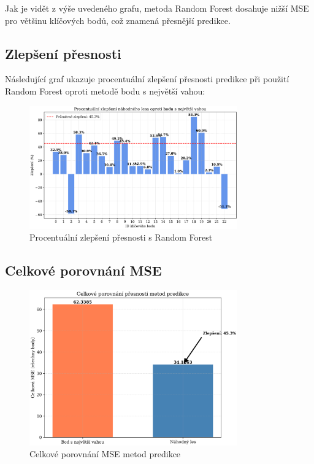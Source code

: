\documentclass[a4paper,12pt]{article}
\begin{document}
Jak je vidět z výše uvedeného grafu, metoda Random Forest dosahuje nižší MSE pro většinu klíčových bodů, což znamená přesnější predikce.

\subsection{Zlepšení přesnosti}

Následující graf ukazuje procentuální zlepšení přesnosti predikce při použití Random Forest oproti metodě bodu s největší vahou:

\begin{figure}[H]
    \centering
    \includegraphics[width=0.8\textwidth]{zlepseni_procenta.png}
    \caption{Procentuální zlepšení přesnosti s Random Forest}
    \label{fig:improvement_percentage}
\end{figure}

\subsection{Celkové porovnání MSE}

\begin{figure}[H]
    \centering
    \includegraphics[width=0.8\textwidth]{celkove_porovnani.png}
    \caption{Celkové porovnání MSE metod predikce}
    \label{fig:overall_comparison}
\end{figure}
\end{document}
